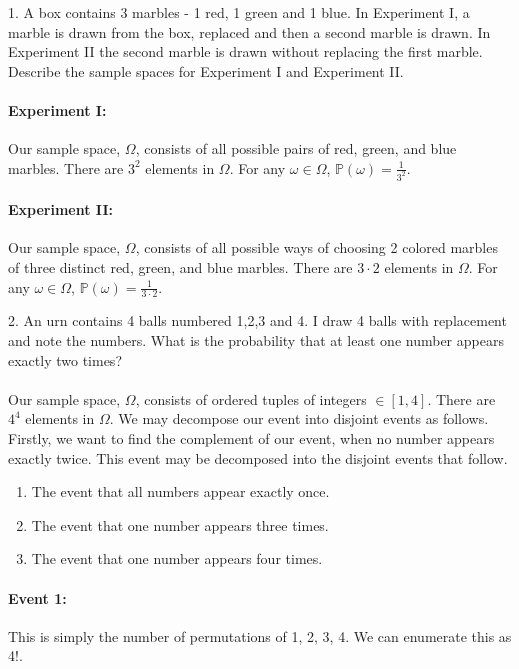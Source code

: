 \documentclass{article}
\begin{document}
1. A box contains 3 marbles - 1 red, 1 green and 1 blue. In Experiment I, a marble is
drawn from the box, replaced and then a second marble is drawn. In Experiment II the
second marble is drawn without replacing the first marble. Describe the sample spaces
for Experiment I and Experiment II.

\paragraph{Experiment I:} Our sample space, $\Omega$, consists of all possible pairs of red, green,
and blue marbles. There are $3^{2}$ elements in $\Omega$. For any $\omega \in \Omega$, $\mathbb{P}(\omega)
= \frac{1}{3^2}$.

\paragraph{Experiment II:} Our sample space, $\Omega$, consists of all possible ways of choosing 2 colored
marbles of three distinct red, green, and blue marbles. There are $3\cdot2$ elements in $\Omega$. For
any $\omega \in \Omega$, $\mathbb{P}(\omega) = \frac{1}{3\cdot2}$.

\vspace{5mm}

2. An urn contains 4 balls numbered 1,2,3 and 4. I draw 4 balls with replacement and
note the numbers. What is the probability that at least one number appears exactly
two times?

\paragraph{} Our sample space, $\Omega$, consists of ordered tuples of integers $\in [1, 4]$. There are
$4^{4}$ elements in $\Omega$. We may decompose our event into disjoint events as follows. Firstly, we 
want to find the complement of our event, when no number appears exactly twice. This event may be
decomposed into the disjoint events that follow.
\begin{enumerate}
    \item The event that all numbers appear exactly once.
    \item The event that one number appears three times.
    \item The event that one number appears four times.
    \end{enumerate}

\paragraph{Event 1:} This is simply the number of permutations of 1, 2, 3, 4. We can enumerate this as 4!.
\end{document}

